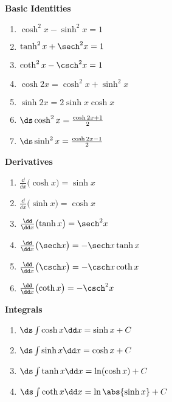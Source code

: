 {
\begin{keyidea}\label{idea:hyperbolic_identities}
\begin{minipage}[t]{.33\linewidth}
\textbf{Basic Identities}\par
{}%
\begin{enumerate}
\item $\cosh^2x-\sinh^2x=1$
\item	$\tanh^2x+\sech^2x=1$
\item	$\coth^2x-\csch^2x = 1$
\item	$\cosh 2x=\cosh^2x+\sinh^2x$
\item	$\sinh 2x = 2\sinh x\cosh x$
\item	$\ds\cosh^2x = \frac{\cosh 2x+1}{2}$
\item $\ds \sinh^2x=\frac{\cosh 2x-1}{2}$
\end{enumerate}
\end{minipage}%
\begin{minipage}[t]{.33\linewidth}
\textbf{Derivatives}
\begin{enumerate}
\item $\frac{\dd}{\dd x}\bigl(\cosh x\bigr) = \sinh x$
\item $\frac{\dd}{\dd x}\bigl(\sinh x\bigr) = \cosh x$
\item $\frac{\dd}{\dd x}\bigl(\tanh x\bigr) = \sech^2 x$
\item $\frac{\dd}{\dd x}\bigl(\sech x\bigr) = -\sech x\tanh x$
\item $\frac{\dd}{\dd x}\bigl(\csch x\bigr) = -\csch x\coth x$
\item $\frac{\dd}{\dd x}\bigl(\coth x\bigr) = -\csch^2x$
\end{enumerate}
\end{minipage}%
\begin{minipage}[t]{.33\linewidth}
\textbf{Integrals}
\begin{enumerate}
\item $\ds\int \cosh x\dd x = \sinh x+C$
\item $\ds\int \sinh x\dd x = \cosh x+C$
\item $\ds\int \tanh x\dd x = \ln(\cosh x) +C$
\item $\ds\int \coth x\dd x = \ln\abs{\sinh x}+C$
\end{enumerate}
\end{minipage}
\end{keyidea}
}

